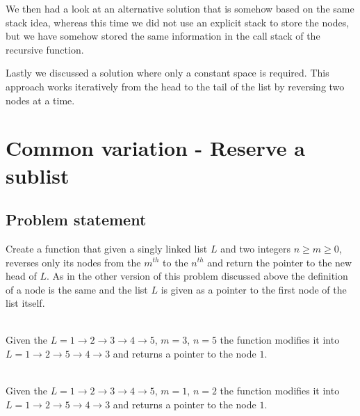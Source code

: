 We then had a look at an alternative solution that is somehow based on the same stack idea, whereas this time we did not use an explicit stack to store the nodes, but we have somehow stored the same information in the 
call stack of the recursive function. 

Lastly we discussed a solution where only a constant space is required. This approach works iteratively from the head to the tail of the list by reversing two nodes at a time.

\section{Common variation - Reserve a sublist}
\subsection{Problem statement}
\begin{exercise}
Create a function that given a singly linked list $L$ and two integers $n \geq  m \geq 0$,
reverses only its nodes from the $m^{th}$ to the $n^{th}$ and return the pointer to the new
head of $L$. As in the other version of this problem discussed above the definition of a node is the same and the list 
$L$ is given as a pointer to the first node of the list itself.

\begin{example}
	\hfill \\
	Given the $L = 1 \rightarrow 2 \rightarrow 3 \rightarrow 4 \rightarrow 5$, $m = 3$, $n = 5$ the function modifies
	it into $L = 1 \rightarrow 2 \rightarrow 5 \rightarrow 4 \rightarrow 3$ and returns a pointer to
	the node $1$.
\end{example}

\begin{example}
	\hfill \\
	Given the $L = 1 \rightarrow 2 \rightarrow 3 \rightarrow 4 \rightarrow 5$, $m = 1$, $n = 2$ the function modifies
	it into $L = 1 \rightarrow 2 \rightarrow 5 \rightarrow 4 \rightarrow 3$ and returns a pointer to
	the node $1$.
\end{example}

\end{exercise}

